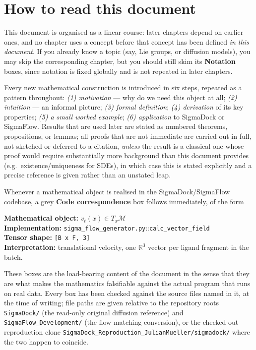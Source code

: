 \documentclass[11pt,a4paper]{report}
\theoremstyle{definition}
\theoremstyle{remark}
\newcommand{\RR}{\mathbb R}
\newcommand{\file}[1]{\texttt{#1}}
\newcommand{\pyfunc}[1]{\texttt{#1}}
\newcommand{\shape}[1]{\texttt{[#1]}}
\begin{document}
\clearpage
\tableofcontents
\clearpage

\chapter*{How to read this document}

This document is organised as a linear course: later chapters depend on
earlier ones, and no chapter uses a concept before that concept has been
defined \emph{in this document}. If you already know a topic (say, Lie
groups, or diffusion models), you may skip the corresponding chapter, but
you should still skim its \textbf{Notation} boxes, since notation is fixed
globally and is not repeated in later chapters.

Every new mathematical construction is introduced in six steps, repeated as
a pattern throughout: \emph{(1) motivation} --- why do we need this object at
all; \emph{(2) intuition} --- an informal picture; \emph{(3) formal
definition}; \emph{(4) derivation} of its key properties; \emph{(5) a small
worked example}; \emph{(6) application} to SigmaDock or SigmaFlow. Results
that are used later are stated as numbered theorems, propositions, or
lemmas; all proofs that are not immediate are carried out in full, not
sketched or deferred to a citation, \emph{unless} the result is a classical
one whose proof would require substantially more background than this
document provides (e.g.\ existence/uniqueness for SDEs), in which case this
is stated explicitly and a precise reference is given rather than an
unstated leap.

Whenever a mathematical object is realised in the SigmaDock/SigmaFlow
codebase, a grey \textbf{Code correspondence} box follows immediately, of
the form
\begin{codebox}
\textbf{Mathematical object:} $v_t(x)\in T_x\mathcal M$ \\
\textbf{Implementation:} \file{sigma\_flow\_generator.py}::\pyfunc{calc\_vector\_field} \\
\textbf{Tensor shape:} \shape{B x F, 3} \\
\textbf{Interpretation:} translational velocity, one $\RR^3$ vector per ligand
fragment in the batch.
\end{codebox}
These boxes are the load-bearing content of the document in the sense that
they are what makes the mathematics falsifiable against the actual program
that runs on real data. Every box has been checked against the source files
named in it, at the time of writing; file paths are given relative to the
repository roots \file{SigmaDock/} (the read-only original diffusion
reference) and \file{SigmaFlow\_Development/} (the flow-matching
conversion), or the checked-out reproduction clone
\file{SigmaDock\_Reproduction\_JulianMueller/sigmadock/} where the two
happen to coincide.
\end{document}

